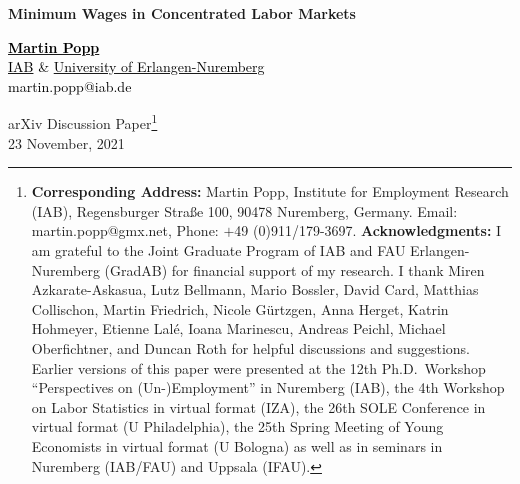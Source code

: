 \documentclass[11pt,oneside,reqno,xcolor=dvipsnames]{article} %
\begin{document}
\begin{titlepage}
\begin{center}


\Large

\textbf{Minimum Wages in Concentrated Labor Markets}

\normalsize

\vspace*{1.75cm}

\href{http://www.iab.de/en/ueberblick/mitarbeiter.aspx/Mitarbeiter/12380200}{\textcolor{black}{\textbf{Martin Popp}}} \\
\href{http://www.iab.de/en/iab-aktuell.aspx}{\textcolor{black}{IAB}} \textcolor{black}{\&} \href{https://www.fau.eu/}{\textcolor{black}{University of Erlangen-Nuremberg}} \\[-0.2cm]
\textcolor{black}{martin.popp@iab.de}

\vspace*{0.9cm}



arXiv Discussion Paper\footnote[1]{\textbf{Corresponding Address:} Martin Popp, Institute for Employment Research (IAB), Regensburger Straße 100, 90478 Nuremberg, Germany. Email: martin.popp@gmx.net, Phone: $\plus$49 (0)911/179-3697. \newline \textbf{Acknowledgments:} I am grateful to the Joint Graduate Program of IAB and FAU Erlangen-Nuremberg (GradAB) for financial support of my research. I thank Miren Azkarate-Askasua, Lutz Bellmann, Mario Bossler, David Card, Matthias Collischon, Martin Friedrich, Nicole Gürtzgen, Anna Herget, Katrin Hohmeyer, Etienne Lal\'{e}, Ioana Marinescu, Andreas Peichl, Michael Oberfichtner, and Duncan Roth for helpful discussions and suggestions. Earlier versions of this paper were presented at the 12th Ph.D.\ Workshop ``Perspectives on (Un-)Employment'' in Nuremberg (IAB), the 4th Workshop on Labor Statistics in virtual format (IZA), the 26th SOLE Conference in virtual format (U Philadelphia), the 25th Spring Meeting of Young Economists in virtual format (U Bologna) as well as in seminars in Nuremberg (IAB/FAU) and Uppsala (IFAU).}  \\
23 November, 2021 %
\\[1.5cm]


\end{center}
\end{titlepage}
\end{document}
